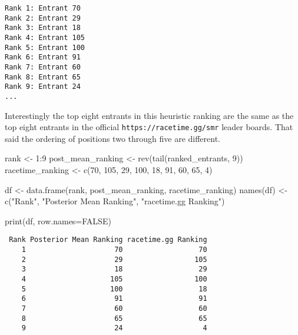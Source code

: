 \documentclass[
  letterpaper,
  DIV=11,
  numbers=noendperiod]{scrartcl}
\newenvironment{Shaded}{\begin{snugshade}}{\end{snugshade}}
\newcommand{\AttributeTok}[1]{\textcolor[rgb]{0.40,0.45,0.13}{#1}}
\newcommand{\ConstantTok}[1]{\textcolor[rgb]{0.56,0.35,0.01}{#1}}
\newcommand{\DecValTok}[1]{\textcolor[rgb]{0.68,0.00,0.00}{#1}}
\newcommand{\FunctionTok}[1]{\textcolor[rgb]{0.28,0.35,0.67}{#1}}
\newcommand{\NormalTok}[1]{\textcolor[rgb]{0.00,0.23,0.31}{#1}}
\newcommand{\OtherTok}[1]{\textcolor[rgb]{0.00,0.23,0.31}{#1}}
\newcommand{\SpecialCharTok}[1]{\textcolor[rgb]{0.37,0.37,0.37}{#1}}
\newcommand{\StringTok}[1]{\textcolor[rgb]{0.13,0.47,0.30}{#1}}
\begin{document}
\begin{verbatim}
Rank 1: Entrant 70
Rank 2: Entrant 29
Rank 3: Entrant 18
Rank 4: Entrant 105
Rank 5: Entrant 100
Rank 6: Entrant 91
Rank 7: Entrant 60
Rank 8: Entrant 65
Rank 9: Entrant 24
...
\end{verbatim}

Interestingly the top eight entrants in this heuristic ranking are the
same as the top eight entrants in the official
\texttt{https://racetime.gg/smr} leader boards. That said the ordering
of positions two through five are different.

\begin{Shaded}
\begin{Highlighting}[]
\NormalTok{rank }\OtherTok{\textless{}{-}} \DecValTok{1}\SpecialCharTok{:}\DecValTok{9}
\NormalTok{post\_mean\_ranking }\OtherTok{\textless{}{-}} \FunctionTok{rev}\NormalTok{(}\FunctionTok{tail}\NormalTok{(ranked\_entrants, }\DecValTok{9}\NormalTok{))}
\NormalTok{racetime\_ranking }\OtherTok{\textless{}{-}} \FunctionTok{c}\NormalTok{(}\DecValTok{70}\NormalTok{, }\DecValTok{105}\NormalTok{, }\DecValTok{29}\NormalTok{, }\DecValTok{100}\NormalTok{, }\DecValTok{18}\NormalTok{, }\DecValTok{91}\NormalTok{, }\DecValTok{60}\NormalTok{, }\DecValTok{65}\NormalTok{, }\DecValTok{4}\NormalTok{)}

\NormalTok{df }\OtherTok{\textless{}{-}} \FunctionTok{data.frame}\NormalTok{(rank, post\_mean\_ranking, racetime\_ranking)}
\FunctionTok{names}\NormalTok{(df) }\OtherTok{\textless{}{-}} \FunctionTok{c}\NormalTok{(}\StringTok{"Rank"}\NormalTok{, }\StringTok{"Posterior Mean Ranking"}\NormalTok{, }\StringTok{"racetime.gg Ranking"}\NormalTok{)}

\FunctionTok{print}\NormalTok{(df, }\AttributeTok{row.names=}\ConstantTok{FALSE}\NormalTok{)}
\end{Highlighting}
\end{Shaded}

\begin{verbatim}
 Rank Posterior Mean Ranking racetime.gg Ranking
    1                     70                  70
    2                     29                 105
    3                     18                  29
    4                    105                 100
    5                    100                  18
    6                     91                  91
    7                     60                  60
    8                     65                  65
    9                     24                   4
\end{verbatim}
\end{document}
